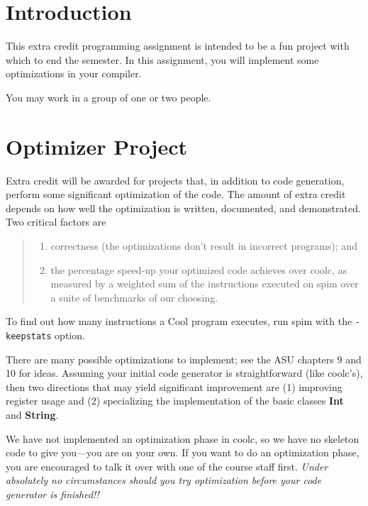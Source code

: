 \documentclass[11pt]{article}
\def\U#1{{\sf{}#1}}
\def\C#1{{\bf{}#1}}
\begin{document}

\section{Introduction} 

This extra credit programming assignment is intended to be a fun
project with which to end the semester. In this assignment, you will
implement some optimizations in your compiler.

You may work in a group of one or two people.

\section{Optimizer Project}

Extra credit will be awarded for projects that, in addition to code
generation, perform some significant optimization of the code.  The
amount of extra credit depends on how well the optimization is
written, documented, and demonstrated.  Two critical factors are
\begin{quote}
\begin{enumerate}
\item correctness (the optimizations don't result in incorrect programs);
      and
\item the percentage speed-up your optimized code achieves over
      \U{coolc}, as measured by a weighted sum of the instructions
      executed on \U{spim} over a suite of benchmarks of our choosing.
\end{enumerate}
\end{quote}
To find out how many instructions a Cool program executes, run
\U{spim} with the {\tt -keepstats} option.

There are many possible optimizations to implement; see the ASU
chapters 9 and 10 for ideas.  Assuming your initial code generator is
straightforward (like \U{coolc}'s), then two directions that may yield
significant improvement are (1) improving register usage and (2)
specializing the implementation of the basic classes \C{Int} and
\C{String}.

We have not implemented an optimization phase in \U{coolc}, so we have
no skeleton code to give you---you are on your own.  If you want to do
an optimization phase, you are encouraged to talk it over with one of
the course staff first. {\em Under absolutely no circumstances should
you try optimization before your code generator is finished!!}
\end{document}

